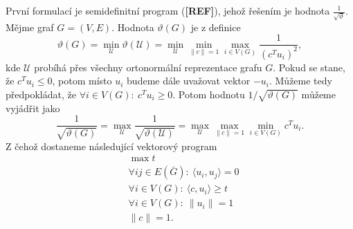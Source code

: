 První formulací je semidefinitní program (\textbf{[REF]}), jehož řešením je hodnota $\frac{1}{\sqrt{\vartheta}}$. Mějme graf $G = (V,E)$. Hodnota $\vartheta(G)$ je z definice
$$
    \vartheta(G) = \min_\mathcal{U} \vartheta(\mathcal{U}) = \min_\mathcal{U} \min_{\|c\|=1} \max_{i \in V(G)} \frac{1}{\left( c^T u_i \right)^2},
$$
kde $\mathcal{U}$ probíhá přes všechny ortonormální reprezentace grafu $G$. Pokud se stane, že $c^T u_i \leq 0$, potom místo $u_i$ budeme dále uvažovat vektor $-u_i$. Můžeme tedy předpokládat, že $\forall i \in V(G):\ c^T u_i \geq 0$. Potom hodnotu $1/\sqrt{\vartheta(G)}$ můžeme vyjádřit jako
$$
    \frac{1}{\sqrt{\vartheta(G)}} = \max_\mathcal{U} \frac{1}{\sqrt{\vartheta(\mathcal{U})}} = \max_\mathcal{U} \max_{\|c\|=1} \min_{i \in V(G)} c^T u_i.
$$
Z čehož dostaneme následující vektorový program
\begin{equation}\tag{VP1}
    \begin{split}
        &\max t \\
        &\forall ij \in E(\bar{G}):\ \langle u_i, u_j \rangle = 0 \\
        &\forall i \in V(G):\ \langle c, u_i \rangle \geq t \\
        &\forall i \in V(G):\ \| u_i \| = 1 \\
        &\| c \| = 1.
    \end{split}
    \label{eq:VP1}
\end{equation}


